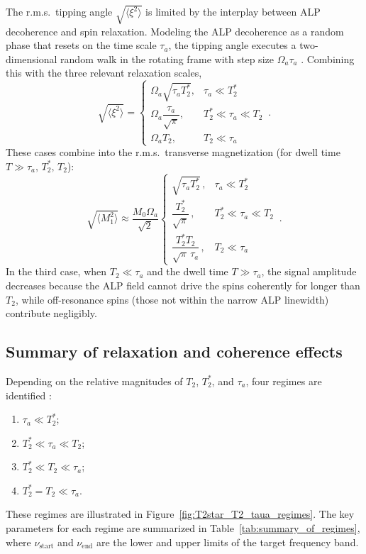 The r.m.s.\ tipping angle $\sqrt{\langle\xi^2\rangle}$ is limited by the interplay between ALP decoherence and spin relaxation. Modeling the ALP decoherence as a random phase that resets on the time scale $\tau_a$, the tipping angle executes a two-dimensional random walk in the rotating frame with step size $\Omega_a\tau_a$ \cite{Yuzhe2023_FrequencyScanning}. Combining this with the three relevant relaxation scales,
\begin{equation}
    \sqrt{\langle \xi^2\rangle}  = \left\{
    \begin{array}{cl}
    \Omega_{a}\sqrt{\tau_a T_2^*} ,
    &  \tau_a \ll T_2^*\\[6pt]
    \Omega_a\dfrac{\tau_a}{\sqrt{\pi}} ,
    &  T_2^*\ll\tau_a \ll T_2\\[6pt]
    \Omega_a T_2 ,
    &  T_2 \ll \tau_a
    \end{array} \right.
    \,.\label{eq:rms_xi}
\end{equation}
These cases combine into the r.m.s.\ transverse magnetization (for dwell time $T \gg \tau_a,\,T_2^*,\,T_2$):
\begin{equation}
    \sqrt{\langle M_{1}^2 \rangle} \approx \dfrac{M_{0}\Omega_a}{\sqrt{2}}\left\{
    \begin{array}{cl}
    \sqrt{\tau_a T_2^*}\, ,
    &  \tau_a \ll T_2^*\\[6pt]
    \dfrac{T_2^*}{\sqrt{\pi}}\, ,
    &  T_2^*\ll\tau_a \ll T_2\\[6pt]
    \dfrac{T_2^* T_2}{\sqrt{\pi}\,\tau_a}\, ,
    &  T_2 \ll \tau_a
    \end{array} \right.
    \,.\label{eq:M1_regimes}
\end{equation}
In the third case, when $T_2 \ll \tau_a$ and the dwell time $T \gg \tau_a$, the signal amplitude decreases because the ALP field cannot drive the spins coherently for longer than $T_2$, while off-resonance spins (those not within the narrow ALP linewidth) contribute negligibly.


\subsection{Summary of relaxation and coherence effects}\label{sec:theory:summary}

Depending on the relative magnitudes of $T_2$, $T_2^*$, and $\tau_a$, four regimes are identified \cite{Yuzhe2023_FrequencyScanning}:
\begin{enumerate}[label = (\arabic*)]
    \item $\tau_a \ll T_2^*$;
    \item $T_2^* \ll \tau_a \ll T_2 $;
    \item $T_2^* \ll T_2 \ll \tau_a$;
    \item $T_2^*=T_2 \ll \tau_a$.
\end{enumerate}
These regimes are illustrated in Figure~\ref{fig:T2star_T2_taua_regimes}. The key parameters for each regime are summarized in Table~\ref{tab:summary_of_regimes}, where $\nu_{\mathrm{start}}$ and $\nu_{\mathrm{end}}$ are the lower and upper limits of the target frequency band.

